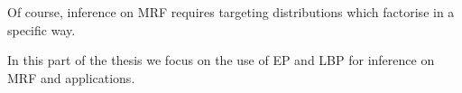Of course, inference on MRF requires targeting distributions which factorise in a specific way. 



In this part of the thesis we focus on the use of EP and LBP for inference on MRF and applications. 







